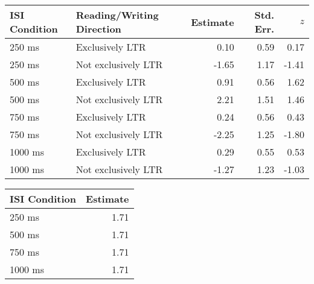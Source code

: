 \begin{appendix}
\begin{table}[!p]
\begin{subtable}{\textwidth}
\begin{table}[H]
\begin{tabular}{llrrr}
\toprule
ISI Condition &  Reading/Writing Direction & Estimate & Std. Err. & $z$\\
\midrule
250  ms & Exclusively LTR & 0.10 & 0.59 & 0.17\\
250  ms & Not exclusively LTR & -1.65 & 1.17 & -1.41\\
500  ms & Exclusively LTR & 0.91 & 0.56 & 1.62\\
500  ms & Not exclusively LTR & 2.21 & 1.51 & 1.46\\
750  ms & Exclusively LTR & 0.24 & 0.56 & 0.43\\
750  ms & Not exclusively LTR & -2.25 & 1.25 & -1.80\\
1000 ms & Exclusively LTR & 0.29 & 0.55 & 0.53\\
1000 ms & Not exclusively LTR & -1.27 & 1.23 & -1.03\\
\bottomrule
\end{tabular}\endgroup{}
\end{table}
\end{subtable}
\begin{subtable}{\textwidth}
\caption{Variance Component Estimates. Estimates are presented on the standard deviation scale. 10\% of the variance is estimated to be at the lab-level and 90\% at the group-level.}
\centering
\begin{table}[H]\centering\begingroup\fontsize{10}{12}\selectfont

\begin{tabular}{lr}
\toprule
ISI Condition & Estimate\\
\midrule
250 ms & 1.71\\
500 ms & 1.71\\
750 ms & 1.71\\
1000 ms & 1.71\\
\bottomrule
\end{tabular}\endgroup{}
\end{table}
\end{subtable}
\end{table}

\begin{table}


\end{table}
\end{appendix}
